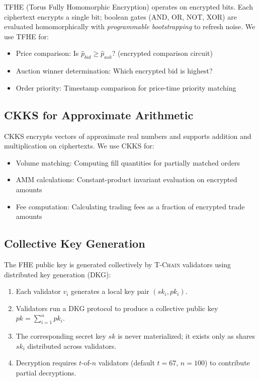 \documentclass[11pt,letterpaper]{article}
\theoremstyle{definition}
\theoremstyle{remark}
\newcommand{\TChain}{\textsc{T-Chain}}
\newcommand{\TFHE}{\textsc{TFHE}}
\newcommand{\CKKS}{\textsc{CKKS}}
\newcommand{\FHE}{\textsc{FHE}}
\begin{document}
\TFHE{} (Torus Fully Homomorphic Encryption) \cite{chillotti2020tfhe} operates on encrypted bits. Each ciphertext encrypts a single bit; boolean gates (AND, OR, NOT, XOR) are evaluated homomorphically with \emph{programmable bootstrapping} to refresh noise. We use \TFHE{} for:

\begin{itemize}
    \item Price comparison: Is $\hat{p}_{\textit{bid}} \geq \hat{p}_{\textit{ask}}$? (encrypted comparison circuit)
    \item Auction winner determination: Which encrypted bid is highest?
    \item Order priority: Timestamp comparison for price-time priority matching
\end{itemize}

\subsection{CKKS for Approximate Arithmetic}

\CKKS{} \cite{cheon2017ckks} encrypts vectors of approximate real numbers and supports addition and multiplication on ciphertexts. We use \CKKS{} for:

\begin{itemize}
    \item Volume matching: Computing fill quantities for partially matched orders
    \item AMM calculations: Constant-product invariant evaluation on encrypted amounts
    \item Fee computation: Calculating trading fees as a fraction of encrypted trade amounts
\end{itemize}

\subsection{Collective Key Generation}

The \FHE{} public key is generated collectively by \TChain{} validators using distributed key generation (DKG):

\begin{enumerate}
    \item Each validator $v_i$ generates a local key pair $(sk_i, pk_i)$.
    \item Validators run a DKG protocol to produce a collective public key $pk = \sum_{i=1}^{n} pk_i$.
    \item The corresponding secret key $sk$ is never materialized; it exists only as shares $sk_i$ distributed across validators.
    \item Decryption requires $t$-of-$n$ validators (default $t = 67$, $n = 100$) to contribute partial decryptions.
\end{enumerate}
\end{document}
